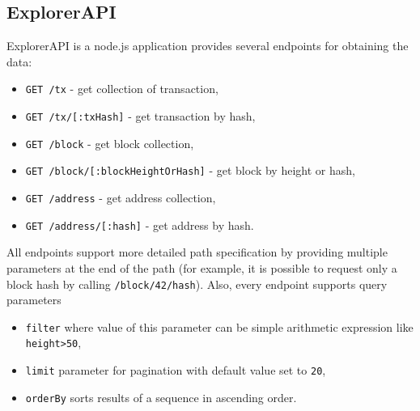 \subsection{ExplorerAPI}
\label{explorerAPIroutes}
ExplorerAPI is a node.js application provides several endpoints for obtaining the data:
\begin{itemize}
    \item \texttt{GET /tx} - get collection of transaction, 
    \item \texttt{GET /tx/[:txHash]} - get transaction by hash,
    \item \texttt{GET /block} - get block collection,
    \item \texttt{GET /block/[:blockHeightOrHash]} - get block by height or hash,
    \item \texttt{GET /address} - get address collection,
    \item \texttt{GET /address/[:hash]} - get address by hash.
\end{itemize}
All endpoints support more detailed path specification by providing multiple parameters at the end of the path (for example, it is possible to request only a block hash by calling \texttt{/block/42/hash}). Also, every endpoint supports query parameters
\begin{itemize}
    \item \texttt{filter} where value of this parameter can be simple arithmetic expression like \texttt{height>50},
    \item \texttt{limit} parameter for pagination with default value set to \texttt{20},
    \item \texttt{orderBy} sorts results of a sequence in ascending order.
\end{itemize}
 



